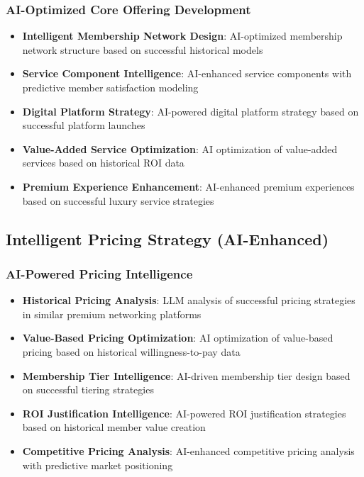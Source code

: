 \subsubsection{AI-Optimized Core Offering Development}

\begin{itemize}
    \item \textbf{Intelligent Membership Network Design}: AI-optimized membership network structure based on successful historical models
    \item \textbf{Service Component Intelligence}: AI-enhanced service components with predictive member satisfaction modeling
    \item \textbf{Digital Platform Strategy}: AI-powered digital platform strategy based on successful platform launches
    \item \textbf{Value-Added Service Optimization}: AI optimization of value-added services based on historical ROI data
    \item \textbf{Premium Experience Enhancement}: AI-enhanced premium experiences based on successful luxury service strategies
\end{itemize}

\subsection{Intelligent Pricing Strategy (AI-Enhanced)}

\subsubsection{AI-Powered Pricing Intelligence}

\begin{itemize}
    \item \textbf{Historical Pricing Analysis}: LLM analysis of successful pricing strategies in similar premium networking platforms
    \item \textbf{Value-Based Pricing Optimization}: AI optimization of value-based pricing based on historical willingness-to-pay data
    \item \textbf{Membership Tier Intelligence}: AI-driven membership tier design based on successful tiering strategies
    \item \textbf{ROI Justification Intelligence}: AI-powered ROI justification strategies based on historical member value creation
    \item \textbf{Competitive Pricing Analysis}: AI-enhanced competitive pricing analysis with predictive market positioning
\end{itemize}


